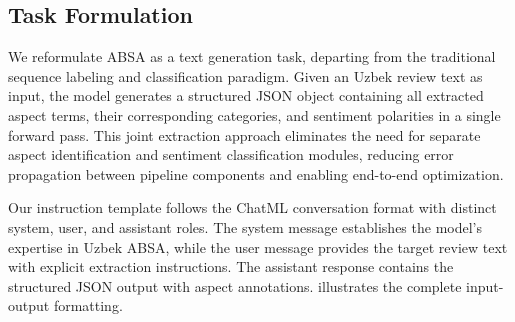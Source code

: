 \documentclass[runningheads]{llncs}
\begin{document}
\subsection{Task Formulation}
\label{sec:data_task}

We reformulate ABSA as a text generation task, departing from the traditional sequence labeling and classification paradigm. Given an Uzbek review text as input, the model generates a structured JSON object containing all extracted aspect terms, their corresponding categories, and sentiment polarities in a single forward pass. This joint extraction approach eliminates the need for separate aspect identification and sentiment classification modules, reducing error propagation between pipeline components and enabling end-to-end optimization.

Our instruction template follows the ChatML conversation format with distinct system, user, and assistant roles. The system message establishes the model's expertise in Uzbek ABSA, while the user message provides the target review text with explicit extraction instructions. The assistant response contains the structured JSON output with aspect annotations.  illustrates the complete input-output formatting.
\end{document}
